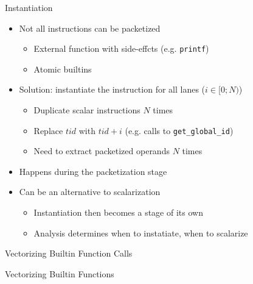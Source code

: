 \begin{frame}{Instantiation}

\begin{itemize}
    \item Not all instructions can be packetized
    \begin{itemize}
        \item External function with side-effcts (e.g. \texttt{printf})
        \item Atomic builtins
    \end{itemize}
    \item Solution: instantiate the instruction for all lanes ($i \in [0;N)$)
    \begin{itemize}
        \item Duplicate scalar instructions $N$ times
        \item Replace $tid$ with \texttt{$tid + i$} (e.g. calls to \texttt{get\_global\_id})
        \item Need to extract packetized operands $N$ times %
    \end{itemize}
    \item Happens during the packetization stage
    \item Can be an alternative to scalarization
    \begin{itemize}
        \item Instantiation then becomes a stage of its own
        \item Analysis determines when to instatiate, when to scalarize
    \end{itemize}
\end{itemize}

\end{frame}


\begin{frame}{Vectorizing Builtin Function Calls}


\end{frame}


\begin{frame}{Vectorizing Builtin Functions}


\end{frame}

